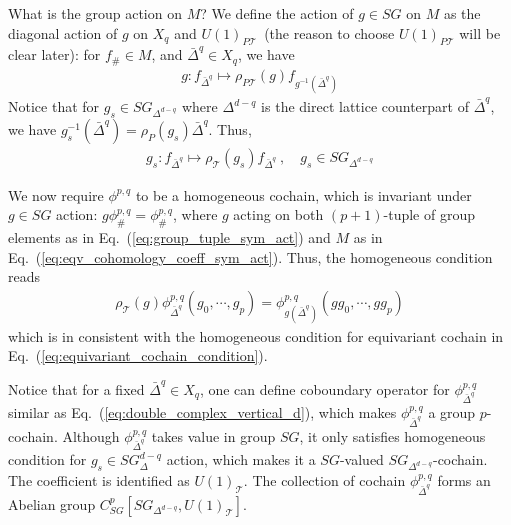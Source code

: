 \documentclass[reprint,amsmath,amssymb,aps,pra,]{revtex4-1}
\newcommand{\TT}{\mathcal{T}} %
\begin{document}
\begin{enumerate}
    What is the group action on $M$?
    We define the action of $g\in SG$ on $M$ as the diagonal action of $g$ on $X_q$ and $U(1)_{P\TT}$~(the reason to choose $U(1)_{P\TT}$ will be clear later): for $f_{\#}\in M$, and $\bar{\Delta}^q\in X_q$, we have
    \begin{align}
      g:f_{\bar{\Delta}^q}\mapsto \rho_{P\TT}(g)f_{g^{-1}(\bar{\Delta}^q)}
      \label{eq:eqv_cohomology_coeff_sym_act}
    \end{align}
    Notice that for $g_s\in SG_{\Delta^{d-q}}$ where $\Delta^{d-q}$ is the direct lattice counterpart of $\bar{\Delta}^q$, we have $g_s^{-1}(\bar{\Delta}^q)=\rho_P(g_s)\bar{\Delta}^q$.
    Thus, 
    \begin{align}
      g_s:f_{\bar{\Delta}^q}\mapsto\rho_\TT(g_s)f_{\bar{\Delta}^q}~,\quad g_s\in SG_{\Delta^{d-q}}
      \label{eq:eqv_cohomology_local_coeff_sym_act}
    \end{align}

    We now require $\phi^{p,q}$ to be a homogeneous cochain, which is invariant under $g\in SG$ action: $g\phi^{p,q}_{\#}=\phi^{p,q}_{\#}$, where $g$ acting on both $(p+1)$-tuple of group elements as in Eq.~(\ref{eq:group_tuple_sym_act}) and $M$ as in Eq.~(\ref{eq:eqv_cohomology_coeff_sym_act}).
    Thus, the homogeneous condition reads
    \begin{align}
      \rho_\TT(g)\phi^{p,q}_{\bar{\Delta}^q}(g_0,\cdots,g_p)=\phi^{p,q}_{g(\bar{\Delta}^q)}(gg_0,\cdots,gg_p)
      \label{eq:eqv_homogenous_cochain}
    \end{align}
    which is in consistent with the homogeneous condition for equivariant cochain in Eq.~(\ref{eq:equivariant_cochain_condition}).

    Notice that for a fixed $\bar{\Delta}^q\in X_q$, one can define coboundary operator for $\phi^{p,q}_{\bar{\Delta}^q}$ similar as Eq.~(\ref{eq:double_complex_vertical_d}), which makes $\phi^{p,q}_{\bar{\Delta}^q}$ a group $p$-cochain.
    Although $\phi^{p,q}_{\bar{\Delta}^q}$ takes value in group $SG$, it only satisfies homogeneous condition for $g_s\in SG_{\Delta}^{d-q}$ action, which makes it a $SG$-valued $SG_{\Delta^{d-q}}$-cochain. 
    The coefficient is identified as $U(1)_\TT$. 
    The collection of cochain $\phi^{p,q}_{\bar{\Delta}^q}$ forms an Abelian group $C^p_{SG}[SG_{\Delta^{d-q}},U(1)_\TT]$. 


\end{enumerate}
\end{document}
